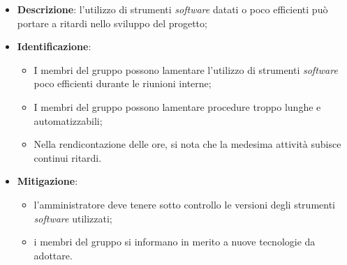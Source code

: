 \label{risk:strumenti software inadeguati}
\begin{itemize}
	\item \textbf{Descrizione}: l'utilizzo di strumenti \textit{software} datati o poco
	      efficienti può portare a ritardi nello sviluppo del progetto;

	\item \textbf{Identificazione}:
	      \begin{itemize}
		      \item I membri del gruppo possono lamentare l'utilizzo di
		            strumenti \textit{software} poco efficienti durante le riunioni
		            interne;

		      \item I membri del gruppo possono lamentare procedure troppo
		            lunghe e automatizzabili;

		      \item Nella rendicontazione delle ore, si nota che la medesima
		            attività subisce continui ritardi.
	      \end{itemize}

	\item \textbf{Mitigazione}:
	      \begin{itemize}
		      \item l'amministratore deve tenere sotto controllo le versioni
		            degli strumenti \textit{software} utilizzati;

		      \item i membri del gruppo si informano in merito a nuove
		            tecnologie da adottare.
	      \end{itemize}
\end{itemize}
